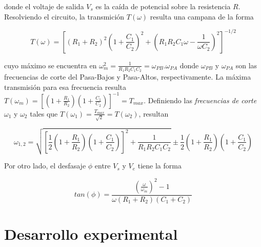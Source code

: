 \documentclass[11pt,a4paper]{article}
\begin{document}
donde el voltaje de salida $V_s$ es la caída de potencial sobre la resistencia $R$. Resolviendo el circuito, la transmición $T(\omega)$ resulta una campana de la forma

\begin{equation}
T(\omega) = [(R_1+R_2)^2(1+\frac{C_1}{C_2})^2+(R_1R_2C_1\omega-\frac{1}{\omega C_2})^2]^{-1/2}
\label{trans_PBanda}
\end{equation}

cuyo máximo se encuentra en $\omega_m^2 = \frac{1}{R_1R_2C_1C_2} = \omega_{PB}.\omega_{PA}$ donde $\omega_{PB}$ y $\omega_{PA}$ son las frecuencias de corte del Pasa-Bajos y Pasa-Altos, respectivamente. La máxima transmisión para esa frecuencia resulta $T(\omega_m) = [(1+\frac{R_1}{R_2})(1+\frac{C_1}{C_2})]^{-1} = T_{max}$. Definiendo las \textit{frecuencias de corte} $\omega_1$ y $\omega_2$ tales que $T(\omega_1) = \frac{T_{max}}{\sqrt{2}} = T(\omega_2)$, resultan

\begin{equation}
\omega_{1,2} = \sqrt{[\frac{1}{2}(1+\frac{R_1}{R_2})(1+\frac{C_1}{C_2})]^2+\frac{1}{R_1R_2C_1C_2}} \pm \frac{1}{2}(1+\frac{R_1}{R_2})(1+\frac{C_1}{C_2})
\label{corte_PBanda}
\end{equation}

Por otro lado, el desfasaje $\phi$ entre $V_s$ y $V_e$ tiene la forma

\begin{equation}
tan(\phi) = \frac{(\frac{\omega}{\omega_m})^2-1}{\omega (R_1+R_2)(C_1+C_2)}
\label{des_PBanda}
\end{equation}


\section{Desarrollo experimental}
\end{document}
